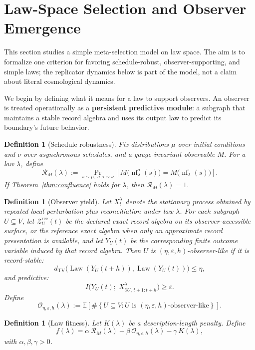 \documentclass[11pt]{article}
\newtheorem{definition}[theorem]{Definition}
\theoremstyle{remark}
\theoremstyle{plain}
\begin{document}
\section{Law-Space Selection and Observer Emergence}

This section studies a simple meta-selection model on law space. The aim is to formalize one
criterion for favoring schedule-robust, observer-supporting, and simple laws; the replicator
dynamics below is part of the model, not a claim about literal cosmological dynamics.

We begin by defining what it means for a law to support observers. An observer is treated
operationally as a \textbf{persistent predictive module}: a subgraph that maintains a stable
record algebra and uses its output law to predict its boundary's future behavior.

\begin{definition}[Schedule robustness]\label{def:robustness}
Fix distributions $\mu$ over initial conditions and $\nu$ over asynchronous schedules, and a gauge-invariant observable $M$. For a law $\lambda$, define
\[
\mathcal{R}_M(\lambda)
:=
\Pr_{s\sim\mu,\;\sigma,\tau\sim\nu}
\!\left[
M\bigl(\operatorname{nf}^{\sigma}_\lambda(s)\bigr)
=
M\bigl(\operatorname{nf}^{\tau}_\lambda(s)\bigr)
\right].
\]
If Theorem~\ref{thm:confluence} holds for $\lambda$, then $\mathcal{R}_M(\lambda)=1$.
\end{definition}

\begin{definition}[Observer yield]\label{def:yield}
Let $X_t^\lambda$ denote the stationary process obtained by repeated local perturbation plus
reconciliation under law $\lambda$. For each subgraph $U\subseteq V$, let
\(\mathcal Z_U^{\mathrm{rec}}(t)\) be the declared exact record algebra on its observer-accessible
surface, or the reference exact algebra when only an approximate record presentation is available,
and let $Y_U(t)$ be the corresponding finite outcome variable induced by that record algebra. Then $U$ is
\((\eta,\varepsilon,h)\)-observer-like if it is record-stable:
\[
d_{\mathrm{TV}}\!\bigl(\operatorname{Law}(Y_U(t+h)),\operatorname{Law}(Y_U(t))\bigr)\le \eta,
\]
and predictive:
\[
I\bigl(Y_U(t);\; X_{\partial U,\,t+1:t+h}^\lambda\bigr)\ge\varepsilon.
\]
Define
\[
\mathcal{O}_{\eta,\varepsilon,h}(\lambda)
:=
\mathbb{E}\!\left[
\#\left\{
U\subseteq V:
U \text{ is } (\eta,\varepsilon,h)\text{-observer-like}
\right\}
\right].
\]
\end{definition}

\begin{definition}[Law fitness]\label{def:fitness}
Let $K(\lambda)$ be a description-length penalty. Define
\[
f(\lambda) = \alpha\,\mathcal{R}_M(\lambda) + \beta\,\mathcal{O}_{\eta,\varepsilon,h}(\lambda) - \gamma\,K(\lambda),
\]
with $\alpha,\beta,\gamma>0$.
\end{definition}
\end{document}
